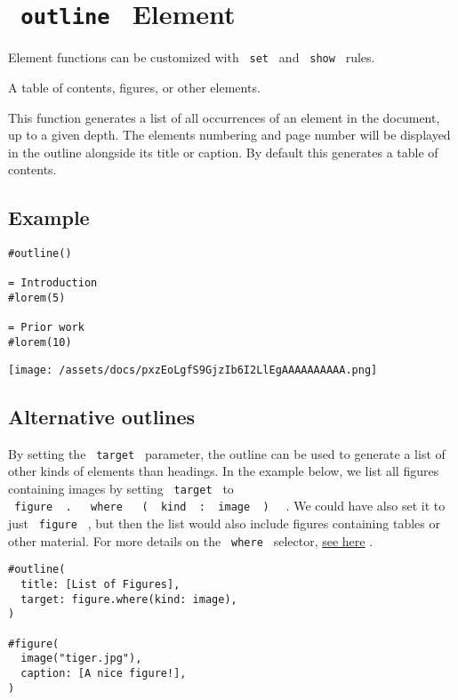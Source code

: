 \section{\texorpdfstring{\texttt{\ outline\ } {{ Element
}}}{ outline   Element }}\label{summary}

\label{element-tooltip}
Element functions can be customized with \texttt{\ set\ } and
\texttt{\ show\ } rules.

A table of contents, figures, or other elements.

This function generates a list of all occurrences of an element in the
document, up to a given depth. The element\textquotesingle s numbering
and page number will be displayed in the outline alongside its title or
caption. By default this generates a table of contents.

\subsection{Example}\label{example}

\begin{verbatim}
#outline()

= Introduction
#lorem(5)

= Prior work
#lorem(10)
\end{verbatim}

\texttt{[image: /assets/docs/pxzEoLgfS9GjzIb6I2LlEgAAAAAAAAAA.png]}

\subsection{Alternative outlines}\label{alternative-outlines}

By setting the \texttt{\ target\ } parameter, the outline can be used to
generate a list of other kinds of elements than headings. In the example
below, we list all figures containing images by setting
\texttt{\ target\ } to
\texttt{\ figure\ }{\texttt{\ .\ }}\texttt{\ }{\texttt{\ where\ }}\texttt{\ }{\texttt{\ (\ }}\texttt{\ kind\ }{\texttt{\ :\ }}\texttt{\ image\ }{\texttt{\ )\ }}\texttt{\ }
. We could have also set it to just \texttt{\ figure\ } , but then the
list would also include figures containing tables or other material. For
more details on the \texttt{\ where\ } selector,
\href{/docs/reference/foundations/function/\#definitions-where}{see
here} .

\begin{verbatim}
#outline(
  title: [List of Figures],
  target: figure.where(kind: image),
)

#figure(
  image("tiger.jpg"),
  caption: [A nice figure!],
)
\end{verbatim}

